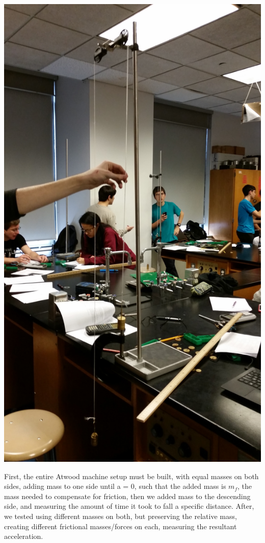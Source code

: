 \documentclass[11pt, titlepage]{article}
\begin{document}
\begin{center}
\includegraphics{lab1.jpg}
\end{center}

First, the entire Atwood machine setup must be built, with equal masses on both sides, adding mass to one side until a = 0, such that the added mass is $m_f$, the mass needed to compensate for friction, then we added mass to the descending side, and measuring the amount of time it took to fall a specific distance. After, we tested using different masses on both, but preserving the relative mass,  creating different frictional masses/forces on each, measuring the resultant acceleration.
\end{document}
